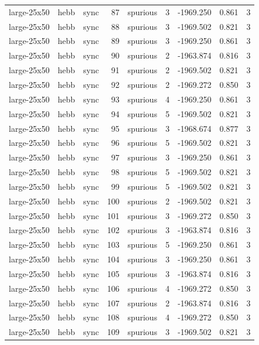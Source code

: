 \begin{tabular}{lllrlrrrr}
large-25x50 & hebb & sync & 87 & spurious & 3 & -1969.250 & 0.861 & 3 \\
large-25x50 & hebb & sync & 88 & spurious & 3 & -1969.502 & 0.821 & 3 \\
large-25x50 & hebb & sync & 89 & spurious & 3 & -1969.250 & 0.861 & 3 \\
large-25x50 & hebb & sync & 90 & spurious & 2 & -1963.874 & 0.816 & 3 \\
large-25x50 & hebb & sync & 91 & spurious & 2 & -1969.502 & 0.821 & 3 \\
large-25x50 & hebb & sync & 92 & spurious & 2 & -1969.272 & 0.850 & 3 \\
large-25x50 & hebb & sync & 93 & spurious & 4 & -1969.250 & 0.861 & 3 \\
large-25x50 & hebb & sync & 94 & spurious & 5 & -1969.502 & 0.821 & 3 \\
large-25x50 & hebb & sync & 95 & spurious & 3 & -1968.674 & 0.877 & 3 \\
large-25x50 & hebb & sync & 96 & spurious & 5 & -1969.502 & 0.821 & 3 \\
large-25x50 & hebb & sync & 97 & spurious & 3 & -1969.250 & 0.861 & 3 \\
large-25x50 & hebb & sync & 98 & spurious & 5 & -1969.502 & 0.821 & 3 \\
large-25x50 & hebb & sync & 99 & spurious & 5 & -1969.502 & 0.821 & 3 \\
large-25x50 & hebb & sync & 100 & spurious & 2 & -1969.502 & 0.821 & 3 \\
large-25x50 & hebb & sync & 101 & spurious & 3 & -1969.272 & 0.850 & 3 \\
large-25x50 & hebb & sync & 102 & spurious & 3 & -1963.874 & 0.816 & 3 \\
large-25x50 & hebb & sync & 103 & spurious & 5 & -1969.250 & 0.861 & 3 \\
large-25x50 & hebb & sync & 104 & spurious & 3 & -1969.250 & 0.861 & 3 \\
large-25x50 & hebb & sync & 105 & spurious & 3 & -1963.874 & 0.816 & 3 \\
large-25x50 & hebb & sync & 106 & spurious & 4 & -1969.272 & 0.850 & 3 \\
large-25x50 & hebb & sync & 107 & spurious & 2 & -1963.874 & 0.816 & 3 \\
large-25x50 & hebb & sync & 108 & spurious & 4 & -1969.272 & 0.850 & 3 \\
large-25x50 & hebb & sync & 109 & spurious & 3 & -1969.502 & 0.821 & 3 \\

\end{tabular}
